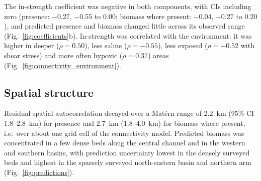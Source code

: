 The in-strength coefficient was negative in both components, with CIs including zero (presence: $-0.27$, $-0.55$ to $0.00$; biomass where present: $-0.04$, $-0.27$ to $0.20$), and predicted presence and biomass changed little across its observed range (Fig.~\ref{fig:coefficients}b). In-strength was correlated with the environment: it was higher in deeper ($\rho=0.50$), less saline ($\rho=-0.55$), less exposed ($\rho=-0.52$ with shear stress) and more often hypoxic ($\rho=0.37$) areas (Fig.~\ref{fig:connectivity_environment}).

\subsection{Spatial structure}

Residual spatial autocorrelation decayed over a Mat\'ern range of 2.2~km (95\% CI 1.8--2.8~km) for presence and 2.7~km (1.8--4.0~km) for biomass where present, i.e.\ over about one grid cell of the connectivity model. Predicted biomass was concentrated in a few dense beds along the central channel and in the western and southern basins, with prediction uncertainty lowest in the densely surveyed beds and highest in the sparsely surveyed north-eastern basin and northern arm (Fig.~\ref{fig:predictions}).
